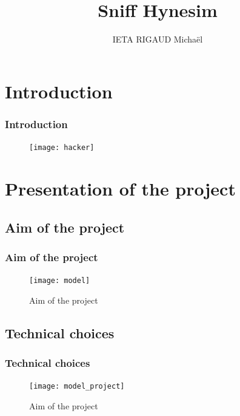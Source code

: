 \documentclass[10pt, svgnames, compress, red]{beamer}
\institute{ENSTA Bretagne}
\title{Sniff Hynesim}
\subtitle{}
\author{IETA RIGAUD Michaël}
\newcounter{th}[section]
\begin{document}
\begin{frame}
  \titlepage
  \transdissolve[duration=0.1]
\end{frame}


\section{Introduction}
\begin{frame}
  \frametitle{Introduction}
  \begin{figure}[h]
    \centering
    \texttt{[image: hacker]}
  \end{figure}
  \transdissolve[duration=0.1]
\end{frame}


\section{Presentation of the project}

\subsection{Aim of the project}
\begin{frame}
  \frametitle{Aim of the project}
  \begin{figure}[h]
    \centering
    \texttt{[image: model]}
    \caption{Aim of the project}
  \end{figure}
\transdissolve[duration=0.1]
\end{frame}

\subsection{Technical choices}
\begin{frame}
  \frametitle{Technical choices}%
  \begin{figure}[h]
    \centering
    \texttt{[image: model\_project]}
    \caption{Aim of the project}
  \end{figure}
\transdissolve[duration=0.1]
\end{frame}



\end{document}
